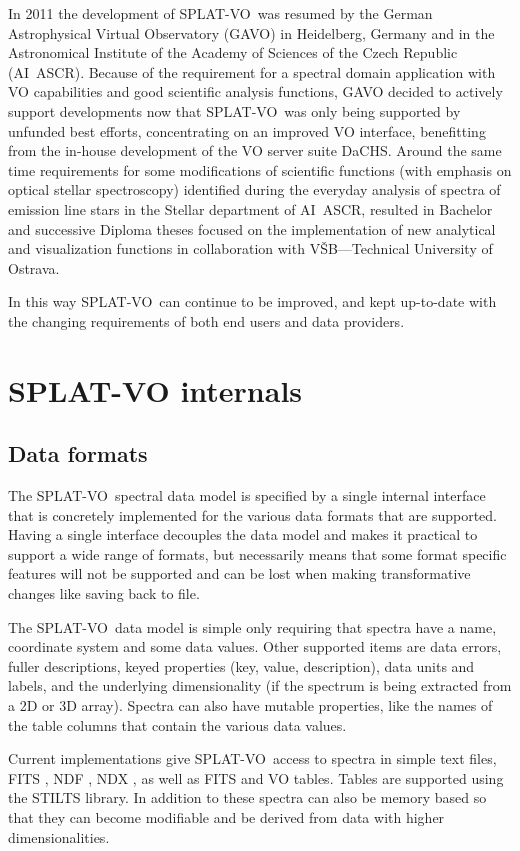 \documentclass[final,authoryear,5p,times,twocolumn]{elsarticle}
\newcommand{\splatvo}{{\textsf{\small{SPLAT-VO}}}}
\newcommand{\dachs}{\textsf{\small DaCHS}}
\newcommand{\ascl}[1]{\href{http://www.ascl.net/#1}{ascl:#1}}
\begin{document}
In 2011 the development of  \splatvo\ was resumed by the German Astrophysical
Virtual Observatory (GAVO) in Heidelberg, Germany and in  the Astronomical
Institute of the Academy of Sciences of the Czech Republic (AI~ASCR).  Because
of the requirement for a spectral domain application with VO capabilities and
good scientific analysis functions, GAVO  decided to actively support
developments now that \splatvo\ was only being supported by unfunded best
efforts, concentrating on an improved VO interface, benefitting from the
in-house development of the VO server suite \dachs.  Around the same time
requirements for some modifications of scientific functions (with emphasis on
optical stellar spectroscopy) identified during the everyday analysis of
spectra of emission line stars in the Stellar department of AI~ASCR, resulted
in Bachelor and successive Diploma theses focused on the implementation of new
analytical and visualization functions in collaboration with
V\v{S}B---Technical University of Ostrava.

In this way \splatvo\ can continue to be improved, and kept up-to-date with the
changing requirements of both end users and data providers.


\section{SPLAT-VO internals}
%
\subsection{Data formats}
%
The \splatvo\ spectral data model is specified by a single internal interface
that is concretely implemented for the various data formats that are
supported. Having a single interface decouples the data model and makes it
practical to support a wide range of formats, but necessarily means that some
format specific features will not be supported and can be lost when making
transformative changes like saving back to file.

The \splatvo\ data model is simple only requiring that spectra have a name,
coordinate system and some data values. Other supported items are data errors,
fuller descriptions, keyed properties (key, value, description), data units
and labels, and the underlying dimensionality (if the spectrum is being
extracted from a 2D or 3D array). Spectra can also have mutable properties,
like the names of the table columns that contain the various data values.

Current implementations give \splatvo\ access to spectra in simple text files,
FITS \citep{2010A&A...524A..42P}, NDF \citep{ndfjenness}, NDX
\citep{2003ASPC..295..221G}, as well as FITS and VO tables. Tables are
supported using the STILTS \citep[][\ascl{1105.001}]{2006ASPC..351..666T}
library. In addition to these spectra can also be memory based so that they can
become modifiable and be derived from data with higher dimensionalities.
\end{document}
